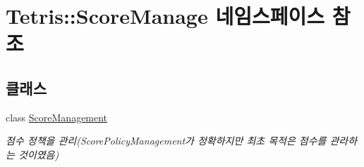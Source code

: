\hypertarget{namespace_tetris_1_1_score_manage}{}\section{Tetris\+:\+:Score\+Manage 네임스페이스 참조}
\label{namespace_tetris_1_1_score_manage}
\subsection*{클래스}
\begin{DoxyCompactItemize}
\item 
class \hyperlink{class_tetris_1_1_score_manage_1_1_score_management}{Score\+Management}
\begin{DoxyCompactList}\small\item\em 점수 정책을 관리(Score\+Policy\+Management가 정확하지만 최초 목적은 점수를 관라하는 것이였음) \end{DoxyCompactList}\end{DoxyCompactItemize}
